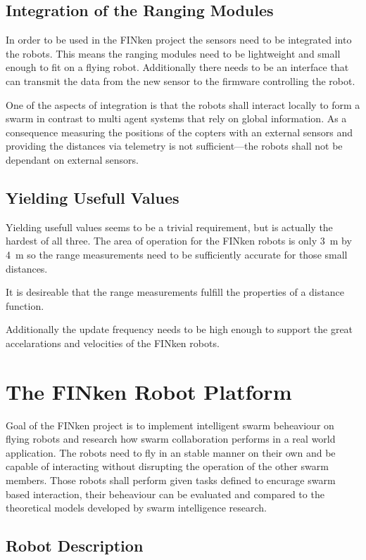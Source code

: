 \subsection{Integration of the Ranging Modules}
\label{req2}
In order to be used in the FINken project the sensors need to be integrated into the robots.
This means the ranging modules need to be lightweight and small enough to fit on a flying robot.
Additionally there needs to be an interface that can transmit the data from the new sensor to the firmware controlling the robot.

One of the aspects of integration is that the robots shall interact locally to form a swarm in contrast to multi agent systems that rely on global information.
As a consequence measuring the positions of the copters with an external sensors and providing the distances via telemetry is not sufficient—the robots shall not be dependant on external sensors.

\subsection{Yielding Usefull Values}
\label{req3}
Yielding usefull values seems to be a trivial requirement, but is actually the hardest of all three.
The area of operation for the FINken robots is only \SI{3}{m} by \SI{4}{m} so the range measurements need to be sufficiently accurate for those small distances.

It is desireable that the range measurements fulfill the properties of a distance function.

Additionally the update frequency needs to be high enough to support the great accelarations and velocities of the FINken robots.


\section{The FINken Robot Platform}


Goal of the FINken project is to implement intelligent swarm beheaviour on flying robots and research how swarm collaboration performs in a real world application.
The robots need to fly in an stable manner on their own and be capable of interacting without disrupting the operation of the other swarm members.
Those robots shall perform given tasks defined to encurage swarm based interaction, their beheaviour can be evaluated and compared to the theoretical models developed by swarm intelligence research.

\subsection{Robot Description}


